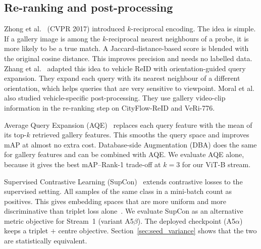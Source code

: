 \subsection{Re-ranking and post-processing}
Zhong et al.~\cite{zhong2017rerank} (CVPR 2017) introduced $k$-reciprocal encoding. The idea is simple. If a gallery image is among the $k$-reciprocal nearest neighbours of a probe, it is more likely to be a true match. A Jaccard-distance-based score is blended with the original cosine distance. This improves precision and needs no labelled data. Zhang et al.~\cite{zhang2022vehiclererank} adapted this idea to vehicle ReID with orientation-guided query expansion. They expand each query with its nearest neighbour of a different orientation, which helps queries that are very sensitive to viewpoint. Moral et al.~\cite{moral2023syntheticrerank} also studied vehicle-specific post-processing. They use gallery video-clip information in the re-ranking step on CityFlow-ReID and VeRi-776.

Average Query Expansion (AQE)~\cite{arandjelovic2012aqe} replaces each query feature with the mean of its top-$k$ retrieved gallery features. This smooths the query space and improves mAP at almost no extra cost. Database-side Augmentation (DBA) does the same for gallery features and can be combined with AQE. We evaluate AQE alone, because it gives the best mAP--Rank-1 trade-off at $k{=}3$ for our ViT-B stream.

Supervised Contrastive Learning (SupCon)~\cite{khosla2020supcon} extends contrastive losses to the supervised setting. All samples of the same class in a mini-batch count as positives. This gives embedding spaces that are more uniform and more discriminative than triplet loss alone~\cite{ye2022survey}. We evaluate SupCon as an alternative metric objective for Stream~1 (variant A5$\beta$). The deployed checkpoint (A5$\alpha$) keeps a triplet $+$ centre objective. Section~\ref{sec:seed_variance} shows that the two are statistically equivalent.
